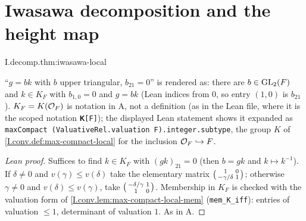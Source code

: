 \section{Iwasawa decomposition and the height map}
\begin{theorem}
\end{theorem}
\begin{tfformal}{I.decomp.thm:iwasawa-local}
\begin{tffidelity}
``$g=bk$ with $b$ upper triangular, $b_{21}=0$'' is rendered as: there are $b\in\mathrm{GL}_2(F)$ and $k\in K_F$ with $b_{1,0}=0$ and $g=bk$ (Lean indices from $0$, so entry $(1,0)$ is $b_{21}$). $K_F=K(\mathcal{O}_F)$ is notation in A, not a definition (as in the Lean file, where it is the scoped notation \texttt{𝐊[F]}); the displayed Lean statement shows it expanded as \texttt{maxCompact (ValuativeRel.valuation F).integer.subtype}, the group $K$ of \cref{I.conv.def:max-compact-local} for the inclusion $\mathcal{O}_F\hookrightarrow F$.
\end{tffidelity}
\end{tfformal}
\begin{proof}[Lean proof]
Suffices to find $k\in K_F$ with $(gk)_{21}=0$ (then $b=gk$ and $k\mapsto k^{-1}$). If $\delta\neq0$ and $v(\gamma)\le v(\delta)$ take the elementary matrix $\begin{psmallmatrix}1&0\\-\gamma/\delta&1\end{psmallmatrix}$; otherwise $\gamma\neq0$ and $v(\delta)\le v(\gamma)$, take $\begin{psmallmatrix}-\delta/\gamma&1\\1&0\end{psmallmatrix}$. Membership in $K_F$ is checked with the valuation form of \cref{I.conv.lem:max-compact-local-mem} (\texttt{mem\_K\_iff}): entries of valuation $\le1$, determinant of valuation $1$. As in A.
\end{proof}

